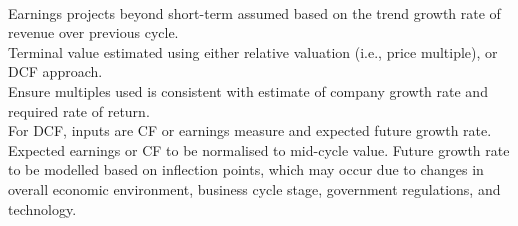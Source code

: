 \begin{remark} \\
Earnings projects beyond short-term assumed based on the trend growth rate of revenue over previous cycle.\\
Terminal value estimated using either relative valuation (i.e., price multiple), or DCF approach.\\
Ensure multiples used is consistent with estimate of company growth rate and required rate of return.\\
For DCF, inputs are CF or earnings measure and expected future growth rate. Expected earnings or CF to be normalised to mid-cycle value. Future growth rate to be modelled based on inflection points, which may occur due to changes in overall economic environment, business cycle stage, government regulations, and technology.
\end{remark}

